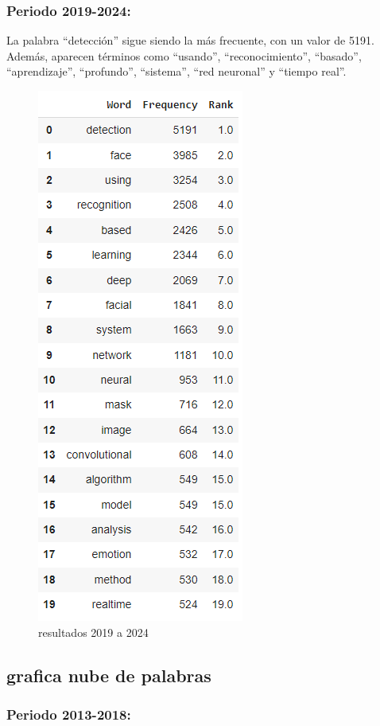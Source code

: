 \documentclass[conference]{IEEEtran}
\begin{document}
\subsubsection{Periodo 2019-2024:}
La palabra “detección” sigue siendo la más frecuente, con un valor de 5191.
Además, aparecen términos como “usando”, “reconocimiento”, “basado”, “aprendizaje”, “profundo”, “sistema”, “red neuronal” y “tiempo real”.
\begin{figure}[H]
    \centering
    \includegraphics[width=0.4\linewidth]{frecuencia2019.png}
    \caption{resultados 2019 a 2024}
    \label{fig:enter-label}
\end{figure}
\subsection{grafica nube de palabras}

\subsubsection{Periodo 2013-2018:}
\end{document}
